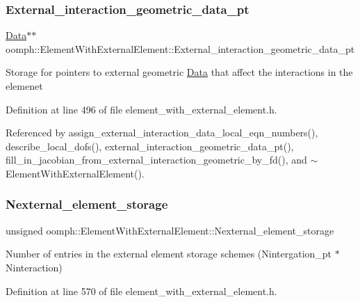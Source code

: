 \subsubsection{\texorpdfstring{External\+\_\+interaction\+\_\+geometric\+\_\+data\+\_\+pt}{External\_interaction\_geometric\_data\_pt}}
{\footnotesize\ttfamily \hyperlink{classoomph_1_1Data}{Data}$\ast$$\ast$ oomph\+::\+Element\+With\+External\+Element\+::\+External\+\_\+interaction\+\_\+geometric\+\_\+data\+\_\+pt\hspace{0.3cm}{\ttfamily [protected]}}

Storage for pointers to external geometric \hyperlink{classoomph_1_1Data}{Data} that affect the interactions in the elemenet 

Definition at line 496 of file element\+\_\+with\+\_\+external\+\_\+element.\+h.



Referenced by assign\+\_\+external\+\_\+interaction\+\_\+data\+\_\+local\+\_\+eqn\+\_\+numbers(), describe\+\_\+local\+\_\+dofs(), external\+\_\+interaction\+\_\+geometric\+\_\+data\+\_\+pt(), fill\+\_\+in\+\_\+jacobian\+\_\+from\+\_\+external\+\_\+interaction\+\_\+geometric\+\_\+by\+\_\+fd(), and $\sim$\+Element\+With\+External\+Element().

\mbox{\label{classoomph_1_1ElementWithExternalElement_a206553e5b109dd57b8b8fae4214d7a80}} 
\subsubsection{\texorpdfstring{Nexternal\+\_\+element\+\_\+storage}{Nexternal\_element\_storage}}
{\footnotesize\ttfamily unsigned oomph\+::\+Element\+With\+External\+Element\+::\+Nexternal\+\_\+element\+\_\+storage\hspace{0.3cm}{\ttfamily [private]}}



Number of entries in the external element storage schemes (Nintergation\+\_\+pt $\ast$ Ninteraction) 



Definition at line 570 of file element\+\_\+with\+\_\+external\+\_\+element.\+h.



